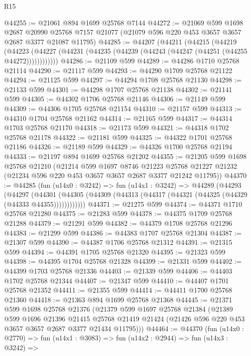 \begin{lexlean}{R15}
\begin{coremodule}
@44255 := @21061 @894 @1699 @25768 @7144
@44272 := @21069
    @599
    @1698
    @2687
    @20990
    @25768
    @7157
    @21077
    (@21079 @596 @220 @453 @3657 @3657 @2687 @3377 @21087 @11795)
@44285 := @44207
    (@44211
      (@44215
        (@44219
          (@44223 (@44227 (@44231 (@44235 (@44239 (@44243 (@44247 (@44251 (@44255 @44272))))))))))))
@44286 := @21109 @599
@44289 := @44286 @1710 @25768 @21114
@44290 := @21117 @599
@44293 := @44290 @1709 @25768 @21122
@44294 := @21125 @599
@44297 := @44294 @1708 @25768 @21130
@44298 := @21133 @599
@44301 := @44298 @1707 @25768 @21138
@44302 := @21141 @599
@44305 := @44302 @1706 @25768 @21146
@44306 := @21149 @599
@44309 := @44306 @1705 @25768 @21154
@44310 := @21157 @599
@44313 := @44310 @1704 @25768 @21162
@44314 := @21165 @599
@44317 := @44314 @1703 @25768 @21170
@44318 := @21173 @599
@44321 := @44318 @1702 @25768 @21178
@44322 := @21181 @599
@44325 := @44322 @1701 @25768 @21186
@44326 := @21189 @599
@44329 := @44326 @1700 @25768 @21194
@44333 := @21197 @894 @1699 @25768 @21202
@44355 := @21205
    @599
    @1698
    @25768
    @21210
    (@21214
      @599
      @1697
      @8746
      @21223
      @25768
      @21227
      @21232
      (@21234 @596 @220 @453 @3657 @3657 @2687 @3377 @21242 @11795))
@44370 := @44285
    (fun (u14x0 : @3242) =>
    fun (u14x1 : @3242) =>
    @44289
      (@44293
        (@44297
          (@44301 (@44305 (@44309 (@44313 (@44317 (@44321 (@44325 (@44329 (@44333 @44355))))))))))))
@44371 := @21275 @599
@44374 := @44371 @1710 @25768 @21280
@44375 := @21283 @599
@44378 := @44375 @1709 @25768 @21288
@44379 := @21291 @599
@44382 := @44379 @1708 @25768 @21296
@44383 := @21299 @599
@44386 := @44383 @1707 @25768 @21304
@44387 := @21307 @599
@44390 := @44387 @1706 @25768 @21312
@44391 := @21315 @599
@44394 := @44391 @1705 @25768 @21320
@44395 := @21323 @599
@44398 := @44395 @1704 @25768 @21328
@44399 := @21331 @599
@44402 := @44399 @1703 @25768 @21336
@44403 := @21339 @599
@44406 := @44403 @1702 @25768 @21344
@44407 := @21347 @599
@44410 := @44407 @1701 @25768 @21352
@44411 := @21355 @599
@44414 := @44411 @1700 @25768 @21360
@44418 := @21363 @894 @1699 @25768 @21368
@44445 := @21371
    @599
    @1698
    @25768
    @21376
    (@21379
      @599
      @1697
      @25768
      @21384
      (@21389
        @599
        @1696
        @21396
        @21415
        @25768
        @21419
        @21424
        (@21426 @596 @220 @453 @3657 @3657 @2687 @3377 @21434 @11795)))
@44464 := @44370
    (fun (u14x0 : @2770) =>
    fun (u14x1 : @3083) =>
    fun (u14x2 : @2944) =>
    fun (u14x3 : @3242) =>

\end{coremodule}
\end{lexlean}
